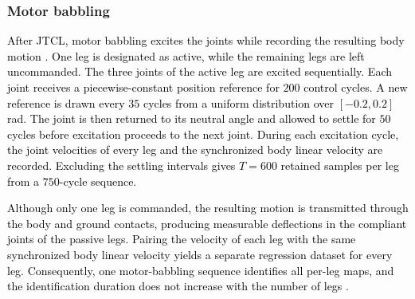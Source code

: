 \documentclass[a4paper, 10pt, conference]{ieeeconf}
\newcommand{\oldtext}[1]{\textcolor{red}{}}
\newcommand{\newtext}[1]{\textcolor{black}{#1}}
\begin{document}
\subsubsection{Motor babbling}
\newtext{After JTCL, motor babbling excites the joints while recording the
resulting body motion \cite{leung2023,ril}. One leg is designated as active,
while the remaining legs are left uncommanded. The three joints of the active leg
are excited sequentially. Each joint receives a piecewise-constant position
reference for $200$ control cycles. A new reference is drawn every $35$ cycles
from a uniform distribution over $[-0.2,0.2]$\,rad. The joint is then returned
to its neutral angle and allowed to settle for $50$ cycles before excitation
proceeds to the next joint. During each excitation cycle, the joint velocities of
every leg and the synchronized body linear velocity are recorded. Excluding the
settling intervals gives $T=600$ retained samples per leg from a $750$-cycle
sequence.}


\newtext{Although only one leg is commanded, the resulting motion is transmitted
through the body and ground contacts, producing measurable deflections in the
compliant joints of the passive legs. Pairing the velocity of each leg with the
same synchronized body linear velocity yields a separate regression dataset for
every leg. Consequently, one motor-babbling sequence identifies all per-leg maps,
and the identification duration does not increase with the number of legs
\cite{ril}.}
\end{document}
